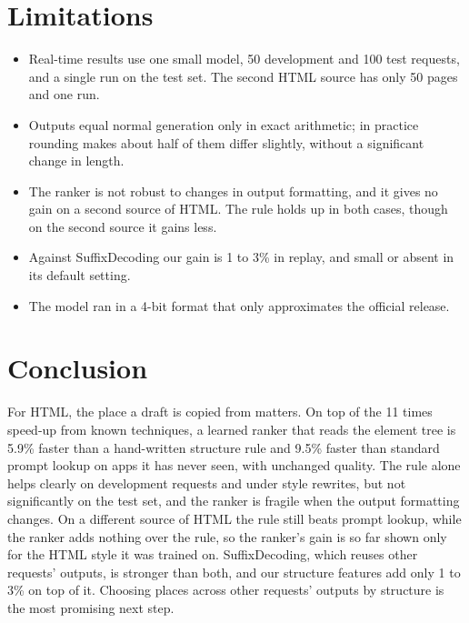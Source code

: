 \documentclass[10pt,a4paper]{article}
\begin{document}
\section{Limitations}
\begin{itemize}[itemsep=1pt]
\item Real-time results use one small model, 50 development and 100 test requests, and a single run on the test set. The second HTML source has only 50 pages and one run.
\item Outputs equal normal generation only in exact arithmetic; in practice rounding makes about half of them differ slightly, without a significant change in length.
\item The ranker is not robust to changes in output formatting, and it gives no gain on a second source of HTML. The rule holds up in both cases, though on the second source it gains less.
\item Against SuffixDecoding our gain is 1 to 3\% in replay, and small or absent in its default setting.
\item The model ran in a 4-bit format that only approximates the official release.
\end{itemize}

\section{Conclusion}
For HTML, the place a draft is copied from matters. On top of the 11 times speed-up from known techniques, a learned ranker that reads the element tree is 5.9\% faster than a hand-written structure rule and 9.5\% faster than standard prompt lookup on apps it has never seen, with unchanged quality. The rule alone helps clearly on development requests and under style rewrites, but not significantly on the test set, and the ranker is fragile when the output formatting changes. On a different source of HTML the rule still beats prompt lookup, while the ranker adds nothing over the rule, so the ranker's gain is so far shown only for the HTML style it was trained on. SuffixDecoding, which reuses other requests' outputs, is stronger than both, and our structure features add only 1 to 3\% on top of it. Choosing places across other requests' outputs by structure is the most promising next step.
\end{document}
